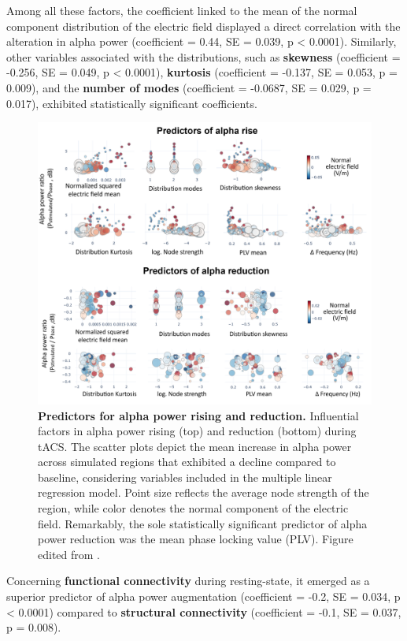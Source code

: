 \documentclass[../main.tex]{subfiles}
\begin{document}
Among all these factors, the coefficient linked to the mean of the normal component distribution of the electric field displayed a direct correlation with the alteration in alpha power (coefficient = 0.44, SE = 0.039, p < 0.0001).
Similarly, other variables associated with the distributions, such as \textbf{skewness} (coefficient = -0.256, SE = 0.049, p < 0.0001), \textbf{kurtosis} (coefficient = -0.137, SE = 0.053, p = 0.009), and the \textbf{number of modes} (coefficient = -0.0687, SE = 0.029, p = 0.017), exhibited statistically significant coefficients.
\begin{figure}[!htb]
\centering
\includegraphics[width=\textwidth]{chapter3/figures/LRM.png}
 \caption{\textbf{Predictors for alpha power rising and reduction.}
 Influential factors in alpha power rising (top) and reduction (bottom) during tACS.
 The scatter plots depict the mean increase in alpha power across simulated regions that exhibited a decline compared to baseline, considering variables included in the multiple linear regression model. Point size reflects the average node strength of the region, while color denotes the normal component of the electric field. Remarkably, the sole statistically significant predictor of alpha power reduction was the mean phase locking value (PLV).
 Figure edited from \citep{cabrera-alvarez_understanding_2023}.}
\label{fig:MLR}
\end{figure}
Concerning \textbf{functional connectivity} during resting-state, it emerged as a superior predictor of alpha power augmentation (coefficient = -0.2, SE = 0.034, p < 0.0001) compared to \textbf{structural connectivity} (coefficient = -0.1, SE = 0.037, p = 0.008).
\end{document}
